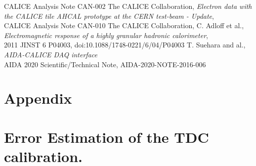 \documentclass[twoside,a4paper,11pt]{article}
\begin{document}
\begin{thebibliography}{10}
	 CALICE Analysis Note CAN-002
	 The CALICE Collaboration, \textit{Electron data with the CALICE tile AHCAL prototype at the CERN test-beam - Update}, \\
	 CALICE Analysis Note CAN-010
	 The CALICE Collaboration, C. Adloff et al., \textit{Electromagnetic response of a highly granular hadronic calorimeter}, \\
	 2011 JINST 6 P04003, doi:10.1088/1748-0221/6/04/P04003
	 T. Suehara and al., \textit{AIDA-CALICE DAQ interface} \\
	 AIDA 2020 Scientific/Technical Note, AIDA-2020-NOTE-2016-006
\end{thebibliography}

\clearpage
\begin{appendix}
\section*{Appendix}
\pagestyle{plain}
\renewcommand{\thetable}{A\arabic{table}}

\section{Error Estimation of the TDC calibration.}
\label{appendix:calib_error}


\end{appendix}
\end{document}
